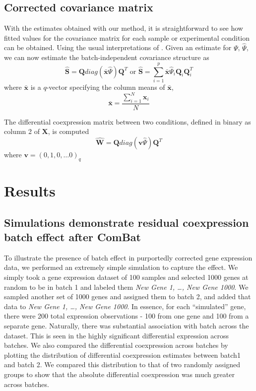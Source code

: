 \subsection{Corrected covariance matrix}

With the estimates obtained with our method, it is straightforward
to see how fitted values for the covariance matrix for each sample
or experimental condition can be obtained. Using the usual interpretations
of . Given an estimate for $\Psi$, $\hat{\Psi}$, we can now estimate
the batch-independent covariance structure as 
\begin{equation}
\hat{\mathbf{S}}=\mathbf{Q}diag\left(\bar{\mathbf{x}}\hat{\Psi}\right)\mathbf{Q}^{T}\text{ or }\hat{\mathbf{S}}=\sum_{i=1}^{p}\bar{\mathbf{x}}\hat{\Psi}_{i}\mathbf{Q}_{i}\mathbf{Q}_{i}^{T}\label{eq:corrected_coexpression}
\end{equation}
 where $\bar{\mathbf{x}}$ is a $q$-vector specifying the column
means of $\bar{\mathbf{x}}$,
\[
\bar{\mathbf{x}}=\frac{\sum_{i=1}^{N}\mathbf{x}_{i}}{N}
\]

The differential coexpression matrix between two conditions, defined
in binary as column 2 of $\mathbf{X}$, is computed
\begin{equation}
\hat{\mathbf{W}}=\mathbf{Q}diag\left(\mathbf{v}\hat{\Psi}\right)\mathbf{Q}^{T}\label{eq:parameter_interpretation}
\end{equation}
where $\mathbf{v}=\left(0,1,0,\dots0\right)_{q}$

\section{Results}

\subsection{Simulations demonstrate residual coexpression batch effect after
ComBat}

To illustrate the presence of batch effect in purportedly corrected
gene expression data, we performed an extremely simple simulation
to capture the effect. We simply took a gene expression dataset of
100 samples and selected 1000 genes at random to be in batch 1 and
labeled them \textit{New Gene 1, \dots, New Gene 1000}. We sampled
another set of 1000 genes and assigned them to batch 2, and added
that data to \textit{New Gene 1, \dots, New Gene 1000}. In essence,
for each ``simulated'' gene, there were 200 total expression observations
- 100 from one gene and 100 from a separate gene. Naturally, there
was substantial association with batch across the dataset. This is
seen in the highly significant differential expression across batches.
We also compared the differential coexpression across batches by plotting
the distribution of differential coexpression estimates between batch1
and batch 2. We compared this distribution to that of two randomly
assigned groups to show that the absolute differential coexpression
was much greater across batches.


